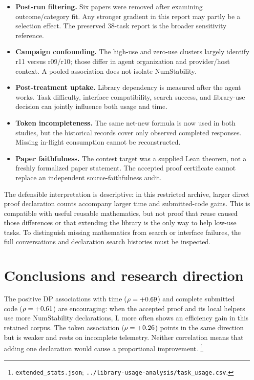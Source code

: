 \documentclass[10pt]{article}
\newcommand{\pathref}[1]{\nolinkurl{#1}}
\begin{document}
\begin{itemize}
\item \textbf{Post-run filtering.} Six papers were removed after examining outcome/category fit. Any stronger gradient in this report may partly be a selection effect. The preserved 38-task report is the broader sensitivity reference.
\item \textbf{Campaign confounding.} The high-use and zero-use clusters largely identify r11 versus r09/r10; those differ in agent organization and provider/host context. A pooled association does not isolate NumStability.
\item \textbf{Post-treatment uptake.} Library dependency is measured after the agent works. Task difficulty, interface compatibility, search success, and library-use decision can jointly influence both usage and time.
\item \textbf{Token incompleteness.} The same net-new formula is now used in both studies, but the historical records cover only observed completed responses. Missing in-flight consumption cannot be reconstructed.
\item \textbf{Paper faithfulness.} The contest target was a supplied Lean theorem, not a freshly formalized paper statement. The accepted proof certificate cannot replace an independent source-faithfulness audit.
\end{itemize}

The defensible interpretation is descriptive: in this restricted archive,
larger direct proof declaration counts accompany larger time and
submitted-code gains. This is compatible with useful reusable
mathematics, but not proof that reuse caused those differences or that
extending the library is the only way to help low-use tasks. To
distinguish missing mathematics from search or interface failures, the
full conversations and declaration search histories must be inspected.

\section{Conclusions and research direction}
The positive DP associations with time ($\rho=+0.69$) and
complete submitted code ($\rho=+0.61$) are encouraging: when the
accepted proof and its local helpers use more NumStability declarations, L more
often shows an efficiency gain in this retained corpus. The token
association ($\rho=+0.26$) points in the same direction but is weaker
and rests on incomplete telemetry. Neither correlation means that
adding one declaration would cause a proportional improvement.
\footnote{\pathref{extended_stats.json};
\pathref{../library-usage-analysis/task_usage.csv}.}
\end{document}
